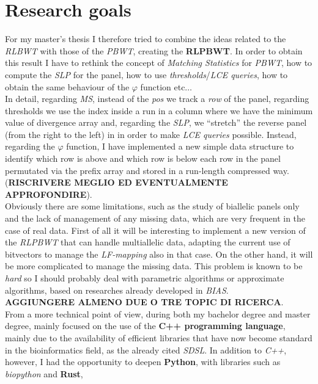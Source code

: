 \documentclass[a4paper,11pt, oneside]{article}
\begin{document}
\section*{Research goals}
For my master's thesis  I therefore tried to combine the ideas related to the
\textit{RLBWT} with those of the \textit{PBWT}, creating the \textbf{RLPBWT}. In
order to obtain this result I have to rethink the concept of \textit{Matching
  Statistics} for \textit{PBWT}, how to compute the \textit{SLP} for the panel,
how to use \textit{thresholds}/\textit{LCE queries}, how to obtain the same
behaviour of the $\varphi$ function etc$\ldots$\\
In detail, regarding \textit{MS}, instead of the \textit{pos} we track a
\textit{row} of the panel, regarding thresholds we use the index inside a run in
a column where we have the minimum value of divergence array and, regarding the
\textit{SLP}, we ``stretch'' the reverse panel (from the right to the left) in
in order to make \textit{LCE queries} possible. Instead, regarding the $\varphi$
function, I have implemented a new simple data structure to identify which row
is above and which row is below each row in the panel permutated via the
prefix array and stored in a run-length compressed way. (\textbf{RISCRIVERE
  MEGLIO ED EVENTUALMENTE APPROFONDIRE}).\\
Obviously there are some limitations, such as the study of biallelic panels
only and the lack of management of any missing data, which are very frequent in
the case of real data. First of all it will be interesting to implement a new
version of the \textit{RLPBWT} that can handle multiallelic data, adapting the
current use of bitvectors to manage the \textit{LF-mapping} also in that
case. On the other hand, it will be more complicated to manage the missing
data. This problem is known to be \textit{hard} so I should probably deal with
parametric algorithms or approximate algorithms, based on researches already
developed in \textit{BIAS}.\\
\textbf{AGGIUNGERE ALMENO DUE O TRE TOPIC DI RICERCA}.\\
From a more technical point of view, during both my bachelor degree and master
degree, mainly focused on the use of the \textbf{C++ programming language},
mainly due to the availability of efficient libraries that have now become
standard in the bioinformatics field, as the already cited \textit{SDSL}. In
addition to \textit{C++}, however, I had the opportunity to deepen
\textbf{Python}, with libraries such as \textit{biopython} and \textbf{Rust},
\end{document}
